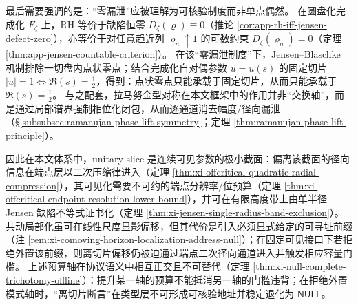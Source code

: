 最后需要强调的是：“零漏泄”应被理解为可核验制度而非单点偶然。
在圆盘化完成化 \(F_\zeta\) 上，RH 等价于缺陷恒零 \(D_{\zeta}(\varrho)\equiv 0\)（推论 \ref{cor:app-rh-iff-jensen-defect-zero}），亦等价于对任意趋近列 \(\varrho_n\uparrow 1\) 的可数约束 \(D_{\zeta}(\varrho_n)=0\)（定理 \ref{thm:app-jensen-countable-criterion}）。
在该“零漏泄制度”下，Jensen--Blaschke 机制排除一切盘内点状零点；结合完成化自对偶参数 \(u=u(s)\) 的固定切片 \(|u|=1\iff \Re(s)=\tfrac12\)，得到：点状零点只能承载于固定切片，从而只能承载于 \(\Re(s)=\tfrac12\)。
与之配套，拉马努金型对称在本文框架中的作用并非“交换轴”，而是通过局部谱界强制相位化闭包，从而逐通道消去幅度/径向漏泄（\S\ref{subsubsec:ramanujan-phase-lift-symmetry}；定理 \ref{thm:ramanujan-phase-lift-principle}）。
\par
因此在本文体系中，unitary slice 是连续可见参数的极小截面：偏离该截面的径向信息在端点层以二次压缩律进入（定理 \ref{thm:xi-offcritical-quadratic-radial-compression}），其可见化需要不可约的端点分辨率/位预算（定理 \ref{thm:xi-offcritical-endpoint-resolution-lower-bound}），并可在有限高度带上由单半径 Jensen 缺陷不等式证书化（定理 \ref{thm:xi-jensen-single-radius-band-exclusion}）。
共动局部化虽可在线性尺度显影偏移，但其代价是引入必须显式给定的可寻址前缀（注 \ref{rem:xi-comoving-horizon-localization-address-null}）；在固定可见接口下若拒绝外置该前缀，则离切片偏移仍被迫通过端点二次径向通道进入并触发相应容量门槛。
上述预算轴在协议语义中相互正交且不可替代（定理 \ref{thm:xi-null-complete-trichotomy-offline}）：提升某一轴的预算不能抵消另一轴的门槛违背；在拒绝外置模式轴时，“离切片断言”在类型层不可形成可核验地址并稳定退化为 \(\mathsf{NULL}\)。

\endinput

